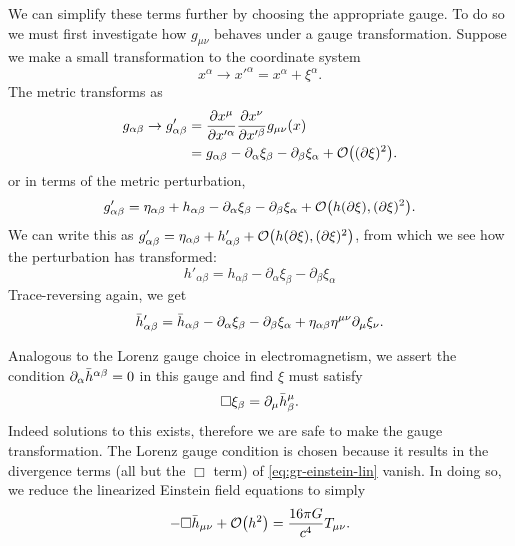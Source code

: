 We can simplify these terms further by choosing the appropriate gauge.
To do so we must first investigate how $g_{\mu\nu}$ behaves under a gauge transformation.
Suppose we make a small transformation to the coordinate system
\begin{equation}
	x^{\alpha} \rightarrow x'^{\alpha} = x^{\alpha} + \xi^{\alpha}.
\end{equation}
The metric transforms as
\begin{align}
	g_{\alpha\beta} \rightarrow g'_{\alpha\beta}
		&= \frac{\partial x^{\mu}}{\partial x'^{\alpha}} \frac{\partial x^{\nu}}{\partial x'^{\beta}} g_{\mu\nu}(x) \\
		&= g_{\alpha\beta} - \partial_{\alpha} \xi_{\beta} - \partial_{\beta} \xi_{\alpha} + \order{(\partial \xi)^2}.
\end{align}
or in terms of the metric perturbation,
\begin{equation}
	g'_{\alpha\beta} = \eta_{\alpha\beta} + h_{\alpha\beta} - \partial_{\alpha} \xi_{\beta} - \partial_{\beta} \xi_{\alpha} + \order{h (\partial \xi), (\partial \xi)^2}.
\end{equation}
We can write this as $g'_{\alpha\beta} = \eta_{\alpha\beta} + h'_{\alpha\beta} + \order{h (\partial \xi), (\partial \xi)^2}$,
from which we see how the perturbation has transformed:
\begin{equation}
	h'_{\alpha\beta} = h_{\alpha\beta} - \partial_{\alpha} \xi_{\beta} - \partial_{\beta} \xi_{\alpha}
\end{equation}
Trace-reversing again, we get
\begin{equation}
	\Bar{h}'_{\alpha\beta} = \Bar{h}_{\alpha\beta} - \partial_{\alpha} \xi_{\beta} - \partial_{\beta} \xi_{\alpha} + \eta_{\alpha\beta} \eta^{\mu\nu} \partial_{\mu} \xi_{\nu}.
\end{equation}

Analogous to the Lorenz gauge choice in electromagnetism, we assert the condition $\partial_{\alpha} \Bar{h}^{\alpha\beta} = 0$ in this gauge and find $\xi$ must satisfy
\begin{equation}
	\Box \xi_{\beta} = \partial_{\mu} \Bar{h}^{\mu}_{\beta}.
\end{equation}
Indeed solutions to this exists, therefore we are safe to make the gauge transformation.
The Lorenz gauge condition is chosen because it results in the divergence terms (all but the $\Box$ term) of \cref{eq:gr-einstein-lin} vanish.
In doing so, we reduce the linearized Einstein field equations to simply
\begin{equation}\label{eq:gr-linear}
	-\Box \Bar{h}_{\mu\nu} + \order{h^2} = \frac{16\pi G}{c^4} T_{\mu\nu}.
\end{equation}

